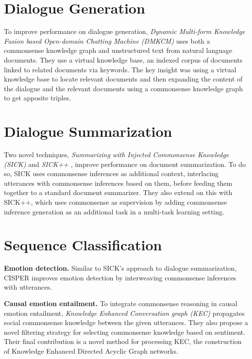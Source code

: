 \documentclass[12pt]{report}
\begin{document}
\section{Dialogue Generation}

To improve performance on dialogue generation, \textit{Dynamic Multi-form Knowledge Fusion based Open-domain Chatting Machine (DMKCM)} \cite{Xu2022-fv} uses both a commonsense knowledge graph and unstructured text from natural language documents.
They use a virtual knowledge base, an indexed corpus of documents linked to related documents via keywords.
The key insight was using a virtual knowledge base to locate relevant documents and then expanding the content of the dialogue and the relevant documents using a commonsense knowledge graph to get apposite triples.

\section{Dialogue Summarization}

Two novel techniques, \textit{Summarizing with Injected Commonsense Knowledge (SICK)} and \textit{SICK++} \cite{Kim2022-pz}, improve performance on document summarization.
To do so, SICK uses commonsense inferences as additional context, interlacing utterances with commonsense inferences based on them, before feeding them together to a standard document summarizer.
They also extend on this with SICK++, which uses commonsense as supervision by adding commonsense inference generation as an additional task in a multi-task learning setting.

\section{Sequence Classification}

\textbf{Emotion detection.}
Similar to SICK's \cite{Kim2022-pz} approach to dialogue summarization, CISPER \cite{Yi2022-tv} improves emotion detection by interweaving commonsense inferences with utterances.

\textbf{Causal emotion entailment.}
To integrate commonsense reasoning in causal emotion entailment, \textit{Knowledge Enhanced Conversation graph (KEC)} \cite{Li2022-jr} propagates social commonsense knowledge between the given utterances.
They also propose a novel filtering strategy for selecting commonsense knowledge based on sentiment.
Their final contribution is a novel method for processing KEC, the construction of Knowledge Enhanced Directed Acyclic Graph networks.
\end{document}
